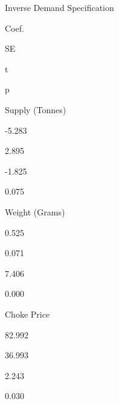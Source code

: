 \documentclass[]{article}
\begin{document}
Inverse Demand Specification

Coef.

SE

t

p

Supply (Tonnes)

-5.283

2.895

-1.825

0.075

Weight (Grams)

0.525

0.071

7.406

0.000

Choke Price

82.992

36.993

2.243

0.030
\end{document}
